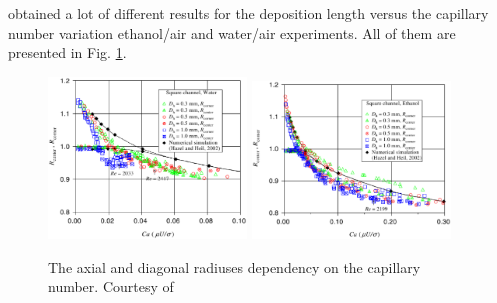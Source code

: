\documentclass{article}
\begin{document}
\citet{shikazono-square} obtained a lot of different results for the deposition length versus the
capillary number variation ethanol/air and water/air experiments. All of them are
presented in Fig. \ref{fig:deposition:han}.
\begin{figure}
\includegraphics[width=0.47\textwidth]{Figures/han_capillary_water_air.eps}\hfill
\includegraphics[width=0.47\textwidth]{Figures/han_capillary_ethanol_air.eps}\\
\caption{The axial and diagonal radiuses dependency on the capillary number. Courtesy of
\citet{shikazono-square} \label{fig:deposition:han}}
\end{figure}
\end{document}
